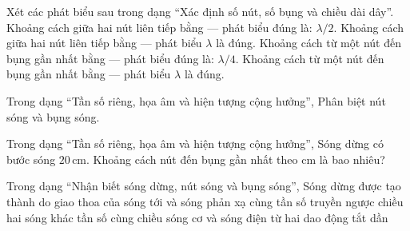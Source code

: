 \begin{ex}
Xét các phát biểu sau trong dạng “Xác định số nút, số bụng và chiều dài dây”.
\choiceTF
{\True Khoảng cách giữa hai nút liên tiếp bằng — phát biểu đúng là: $\lambda/2$.}
{Khoảng cách giữa hai nút liên tiếp bằng — phát biểu $\lambda$ là đúng.}
{\True Khoảng cách từ một nút đến bụng gần nhất bằng — phát biểu đúng là: $\lambda/4$.}
{Khoảng cách từ một nút đến bụng gần nhất bằng — phát biểu $\lambda$ là đúng.}
\end{ex}

\begin{ex}
Trong dạng “Tần số riêng, họa âm và hiện tượng cộng hưởng”, Phân biệt nút sóng và bụng sóng.
\choiceTF

\end{ex}

\begin{ex}
Trong dạng “Tần số riêng, họa âm và hiện tượng cộng hưởng”, Sóng dừng có bước sóng $20\,\text{cm}$. Khoảng cách nút đến bụng gần nhất theo cm là bao nhiêu?
\end{ex}

\begin{ex}
Trong dạng “Nhận biết sóng dừng, nút sóng và bụng sóng”, Sóng dừng được tạo thành do giao thoa của
\choice
{\True sóng tới và sóng phản xạ cùng tần số truyền ngược chiều}
{hai sóng khác tần số cùng chiều}
{sóng cơ và sóng điện từ}
{hai dao động tắt dần}
\end{ex}

